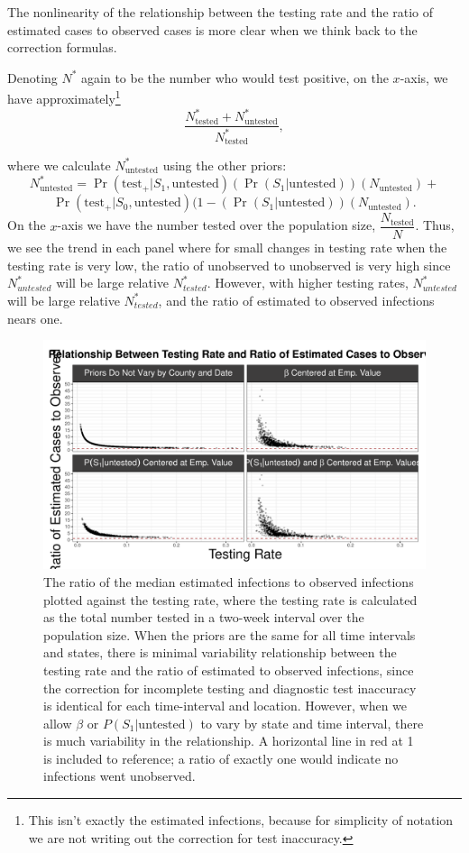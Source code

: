 \documentclass[12pt,twoside]{smiththesis}
\begin{document}
The nonlinearity of the relationship between the testing rate and the ratio of estimated cases to observed cases is more clear when we think back to the correction formulas.

Denoting \(N^*\) again to be the number who would test positive, on the \(x\)-axis, we have approximately\footnote{This isn't exactly the estimated infections, because for simplicity of notation we are not writing out the correction for test inaccuracy.}
\[\frac{N^*_{\text{tested}} + N^*_{\text{untested}}}{N^*_{\text{tested}}},\]

where we calculate \(N^*_{\text{untested}}\) using the other priors:
\[N^*_{\text{untested}} =\Pr(\text{test}_+|S_1,\text{untested}) (\Pr(S_1 | \text{untested})) ( N_{\text{untested}} ) + \]
\[\Pr(\text{test}_+|S_0,\text{untested}) (1-(\Pr(S_1 | \text{untested})) ( N_{\text{untested}} ).\]
On the \(x\)-axis we have the number tested over the population size, \(\dfrac{N_{\text{tested}}}{N}\). Thus, we see the trend in each panel where for small changes in testing rate when the testing rate is very low, the ratio of unobserved to unobserved is very high since \(N^*_{untested}\) will be large relative \(N^*_{tested}\). However, with higher testing rates, \(N^*_{untested}\) will be large relative \(N^*_{tested}\), and the ratio of estimated to observed infections nears one.
\begin{figure}
\includegraphics[width=1\linewidth]{figure/testing_rate_ratio} \caption{\label{fig:testrate}The ratio of the median estimated infections to observed infections plotted against the testing rate, where the testing rate is calculated as the total number tested in a two-week interval over the population size. When the priors are the same for all time intervals and states, there is minimal variability relationship between the testing rate and the ratio of estimated to observed infections, since the correction for incomplete testing and diagnostic test inaccuracy is identical for each time-interval and location. However, when we allow $\beta$ or $P(S_1|\text{untested})$ to vary by state and time interval, there is much variability in the relationship. A horizontal line in red at 1 is included to reference; a ratio of exactly one would indicate no infections went unobserved.}\label{fig:unnamed-chunk-12}
\end{figure}
\end{document}
